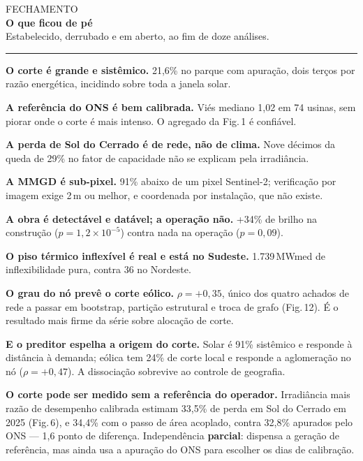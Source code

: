 \documentclass[10pt]{article}
\newcommand{\cab}[3]{%
  {\color{claro}\footnotesize\textsf{#1}}\\[-2pt]
  {\LARGE\textbf{#2}}\\[2pt]
  {\color{cinza}\small #3}\par\vspace{4pt}
  {\color{claro}\rule{\linewidth}{0.4pt}}\par\vspace{5pt}}
\newcommand{\bloco}[1]{\vspace{2pt}{\color{vermelho}\footnotesize\textbf{#1}}\par\vspace{-2pt}}
\begin{document}
\cab{FECHAMENTO}{O que ficou de pé}{Estabelecido, derrubado e em aberto, ao fim de doze análises.}

\begin{minipage}[t]{0.315\linewidth}\vspace{0pt}\small
\bloco{Estabelecido}
\textbf{O corte é grande e sistêmico.} 21,6\% no parque com apuração, dois terços
por razão energética, incidindo sobre toda a janela solar.

\textbf{A referência do ONS é bem calibrada.} Viés mediano 1,02 em 74 usinas, sem
piorar onde o corte é mais intenso. O agregado da Fig.\,1 é confiável.

\textbf{A perda de Sol do Cerrado é de rede, não de clima.} Nove décimos da queda de
29\% no fator de capacidade não se explicam pela irradiância.

\textbf{A MMGD é sub-pixel.} 91\% abaixo de um pixel Sentinel-2; verificação por
imagem exige 2\,m ou melhor, e coordenada por instalação, que não existe.

\textbf{A obra é detectável e datável; a operação não.} +34\% de brilho na
construção ($p=1{,}2\times10^{-5}$) contra nada na operação ($p=0{,}09$).

\textbf{O piso térmico inflexível é real e está no Sudeste.} 1.739\,MWmed de
inflexibilidade pura, contra 36 no Nordeste.

\textbf{O grau do nó prevê o corte eólico.} $\rho = +0{,}35$, único dos quatro achados
de rede a passar em bootstrap, partição estrutural e troca de grafo (Fig.\,12). É o
resultado mais firme da série sobre alocação de corte.

\textbf{E o preditor espelha a origem do corte.} Solar é 91\% sistêmico e responde à
distância à demanda; eólica tem 24\% de corte local e responde a aglomeração no nó
($\rho = +0{,}47$). A dissociação sobrevive ao controle de geografia.

\textbf{O corte pode ser medido sem a referência do operador.} Irradiância mais razão de
desempenho calibrada estimam 33,5\% de perda em Sol do Cerrado em 2025 (Fig.\,6), e
34,4\% com o passo de área acoplado, contra 32,8\% apurados pelo ONS --- 1,6 ponto de
diferença. Independência \textbf{parcial}: dispensa a geração de referência, mas ainda
usa a apuração do ONS para escolher os dias de calibração.
\end{minipage}\hfill
\end{document}
